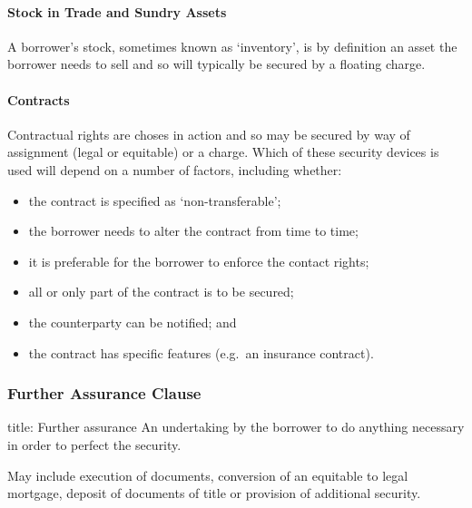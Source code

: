 \documentclass[
]{article}
\newenvironment{Shaded}{}{}
\newcommand{\NormalTok}[1]{#1}
\providecommand{\tightlist}{%
  \setlength{\itemsep}{0pt}\setlength{\parskip}{0pt}}
\begin{document}
\hypertarget{stock-in-trade-and-sundry-assets}{%
\paragraph{Stock in Trade and Sundry
Assets}\label{stock-in-trade-and-sundry-assets}}

A borrower's stock, sometimes known as `inventory', is by definition an
asset the borrower needs to sell and so will typically be secured by a
floating charge.

\hypertarget{contracts}{%
\paragraph{Contracts}\label{contracts}}

Contractual rights are choses in action and so may be secured by way of
assignment (legal or equitable) or a charge. Which of these security
devices is used will depend on a number of factors, including whether:

\begin{itemize}
\tightlist
\item
  the contract is specified as `non-transferable';
\item
  the borrower needs to alter the contract from time to time;
\item
  it is preferable for the borrower to enforce the contact rights;
\item
  all or only part of the contract is to be secured;
\item
  the counterparty can be notified; and
\item
  the contract has specific features (e.g.~an insurance contract).
\end{itemize}

\hypertarget{further-assurance-clause}{%
\subsubsection{Further Assurance
Clause}\label{further-assurance-clause}}

\begin{Shaded}
\begin{Highlighting}[]
\NormalTok{title: Further assurance}
\NormalTok{An undertaking by the borrower to do anything necessary in order to perfect the security.}
\end{Highlighting}
\end{Shaded}

May include execution of documents, conversion of an equitable to legal
mortgage, deposit of documents of title or provision of additional
security.
\end{document}
